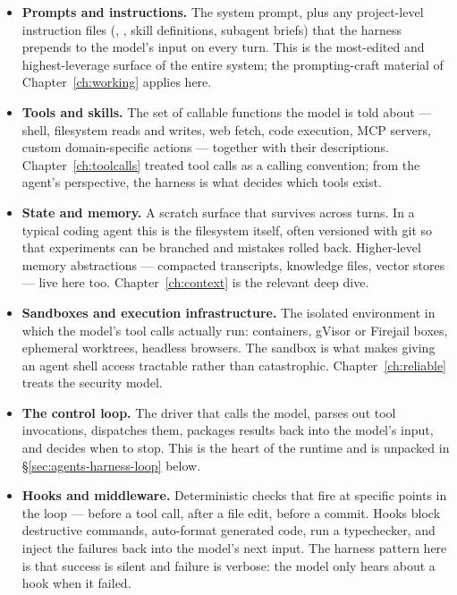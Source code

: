 \begin{itemize}[leftmargin=1.5em,itemsep=0.3em]

\item \textbf{Prompts and instructions.} The system prompt, plus
  any project-level instruction files (,
  , skill definitions, subagent briefs) that the
  harness prepends to the model's input on every turn. This is
  the most-edited and highest-leverage surface of the entire
  system; the prompting-craft material of
  Chapter~\ref{ch:working} applies here.

\item \textbf{Tools and skills.} The set of callable functions
  the model is told about --- shell, filesystem reads and
  writes, web fetch, code execution, MCP servers, custom
  domain-specific actions --- together with their descriptions.
  Chapter~\ref{ch:toolcalls} treated tool calls as a calling
  convention; from the agent's perspective, the harness is what
  decides which tools exist.

\item \textbf{State and memory.} A scratch surface that survives
  across turns. In a typical coding agent this is the filesystem
  itself, often versioned with git so that experiments can be
  branched and mistakes rolled back. Higher-level memory
  abstractions --- compacted transcripts, knowledge files,
  vector stores --- live here too. Chapter~\ref{ch:context} is
  the relevant deep dive.

\item \textbf{Sandboxes and execution infrastructure.} The
  isolated environment in which the model's tool calls actually
  run: containers, gVisor or Firejail boxes, ephemeral worktrees,
  headless browsers. The sandbox is what makes giving an agent
  shell access tractable rather than catastrophic.
  Chapter~\ref{ch:reliable} treats the security model.

\item \textbf{The control loop.} The driver that calls the
  model, parses out tool invocations, dispatches them, packages
  results back into the model's input, and decides when to stop.
  This is the heart of the runtime and is unpacked in
  \S\ref{sec:agents-harness-loop} below.

\item \textbf{Hooks and middleware.} Deterministic checks that
  fire at specific points in the loop --- before a tool call,
  after a file edit, before a commit. Hooks block destructive
  commands, auto-format generated code, run a typechecker, and
  inject the failures back into the model's next input. The
  harness pattern here is that success is silent and failure is
  verbose: the model only hears about a hook when it failed.


\end{itemize}
